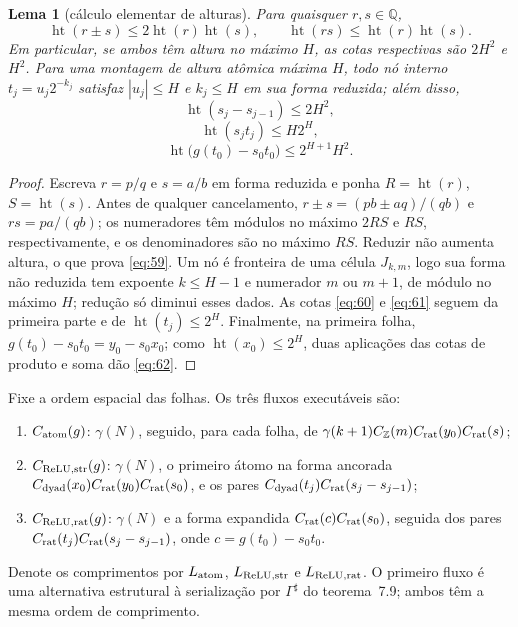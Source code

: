\documentclass[11pt,a4paper]{article}
\theoremstyle{preciso}
\newtheorem{lema}[teorema]{Lema}
\theoremstyle{definition}
\newcommand{\Z}{\mathbb Z}
\newcommand{\Q}{\mathbb Q}
\newcommand{\heightq}{\operatorname{ht}}
\newcommand{\eqn}[2]{\begin{equation}\label{eq:#1}#2\end{equation}}
\begin{document}
\begin{lema}[cálculo elementar de alturas]
Para quaisquer $r,s\in\Q$,
\eqn{59}{\heightq(r\pm s)\le2\heightq(r)\heightq(s),\qquad\heightq(rs)\le\heightq(r)\heightq(s).}
Em particular, se ambos têm altura no máximo $H$, as cotas respectivas são $2H^2$ e $H^2$. Para uma montagem de altura atômica máxima $H$, todo nó interno $t_j=u_j2^{-k_j}$ satisfaz $|u_j|\le H$ e $k_j\le H$ em sua forma reduzida; além disso,
\eqn{60}{\heightq(s_j-s_{j-1})\le2H^2,}
\eqn{61}{\heightq(s_jt_j)\le H2^H,}
\eqn{62}{\heightq\bigl(g(t_0)-s_0t_0\bigr)\le2^{H+1}H^2.}
\end{lema}
\begin{proof}
Escreva $r=p/q$ e $s=a/b$ em forma reduzida e ponha $R=\heightq(r)$, $S=\heightq(s)$. Antes de qualquer cancelamento, $r\pm s=(pb\pm aq)/(qb)$ e $rs=pa/(qb)$; os numeradores têm módulos no máximo $2RS$ e $RS$, respectivamente, e os denominadores são no máximo $RS$. Reduzir não aumenta altura, o que prova \eqref{eq:59}. Um nó é fronteira de uma célula $J_{k,m}$, logo sua forma não reduzida tem expoente $k\le H-1$ e numerador $m$ ou $m+1$, de módulo no máximo $H$; redução só diminui esses dados. As cotas \eqref{eq:60} e \eqref{eq:61} seguem da primeira parte e de $\heightq(t_j)\le2^H$. Finalmente, na primeira folha, $g(t_0)-s_0t_0=y_0-s_0x_0$; como $\heightq(x_0)\le2^H$, duas aplicações das cotas de produto e soma dão \eqref{eq:62}.
\end{proof}
Fixe a ordem espacial das folhas. Os três fluxos executáveis são:
\begin{enumerate}[label=(\roman*),topsep=5pt,itemsep=4pt]
\item $C_{\rm atom}(g)$: $\gamma(N)$, seguido, para cada folha, de $\gamma(k+1)C_{\Z}(m)C_{\rm rat}(y_0)C_{\rm rat}(s)$;
\item $C_{\rm ReLU,str}(g)$: $\gamma(N)$, o primeiro átomo na forma ancorada $C_{\rm dyad}(x_0)C_{\rm rat}(y_0)C_{\rm rat}(s_0)$, e os pares $C_{\rm dyad}(t_j)C_{\rm rat}(s_j-s_{j-1})$;
\item $C_{\rm ReLU,rat}(g)$: $\gamma(N)$ e a forma expandida $C_{\rm rat}(c)C_{\rm rat}(s_0)$, seguida dos pares $C_{\rm rat}(t_j)C_{\rm rat}(s_j-s_{j-1})$, onde $c=g(t_0)-s_0t_0$.
\end{enumerate}
Denote os comprimentos por $L_{\rm atom}$, $L_{\rm ReLU,str}$ e $L_{\rm ReLU,rat}$. O primeiro fluxo é uma alternativa estrutural à serialização por $\Gamma^\sharp$ do teorema~7.9; ambos têm a mesma ordem de comprimento.
\end{document}
